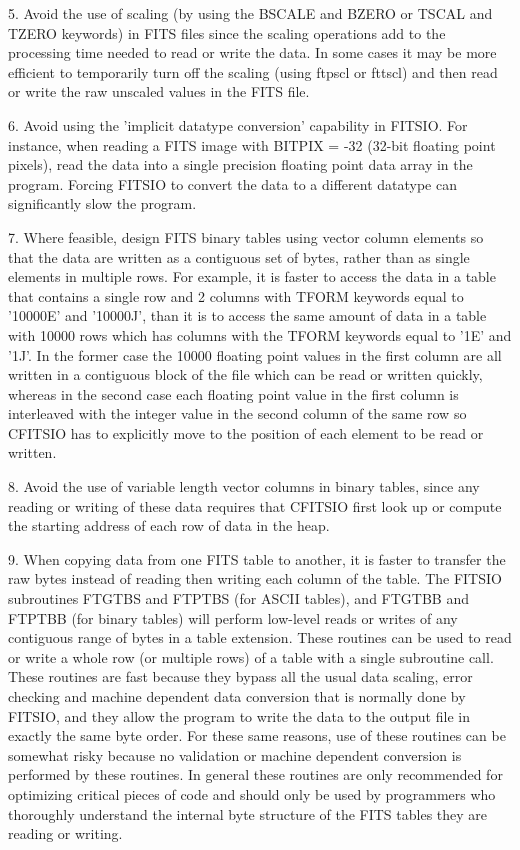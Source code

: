 \documentclass[11pt]{book}
\begin{document}
5. Avoid the use of scaling (by using the BSCALE and BZERO or TSCAL and
TZERO keywords) in FITS files since the scaling operations add to the
processing time needed to read or write the data.  In some cases it may
be more efficient to temporarily turn off the scaling (using ftpscl or
fttscl) and then read or write the raw unscaled values in the FITS
file.

6. Avoid using the 'implicit datatype conversion' capability in
FITSIO.  For instance, when reading a FITS image with BITPIX = -32
(32-bit floating point pixels), read the data into a single precision
floating point data array in the program.  Forcing FITSIO to convert
the data to a different datatype can significantly slow the program.

7. Where feasible, design FITS binary tables using vector column
elements so that the data are written as a contiguous set of bytes,
rather than as single elements in multiple rows.  For example, it is
faster to access the data in a table that contains a single row
and 2 columns with TFORM keywords equal to  '10000E' and '10000J', than
it is to access the same amount of data in a table with 10000 rows
which has columns with the TFORM keywords equal to '1E' and '1J'.  In
the former case the 10000 floating point values in the first column are
all written in a contiguous block of the file which can be read or
written quickly, whereas in the second case each floating point value
in the first column is interleaved with the integer value in the second
column of the same row so CFITSIO has to explicitly move to the
position of each element to be read or written.

8. Avoid the use of variable length vector columns in binary tables,
since any reading or writing of these data requires that CFITSIO first
look up or compute the starting address of each row of data in the
heap.

9. When copying data from one FITS table to another, it is faster to
transfer the raw bytes instead of reading then writing each column of
the table.  The FITSIO subroutines FTGTBS and FTPTBS (for ASCII
tables), and  FTGTBB and FTPTBB (for binary tables) will perform
low-level reads or writes of any contiguous range of bytes in a table
extension.  These routines can be used to read or write a whole row (or
multiple rows) of a table with a single subroutine call.   These
routines are fast because they bypass all the usual data scaling, error
checking and machine dependent data conversion that is normally done by
FITSIO, and they allow the program to write the data to the output file
in exactly the same byte order.  For these same reasons, use of these
routines can be somewhat risky because no validation or machine
dependent conversion is performed by these routines.  In general these
routines are only recommended for optimizing critical pieces of code
and should only be used by programmers who thoroughly understand the
internal byte structure of the FITS tables they are reading or
writing.
\end{document}
